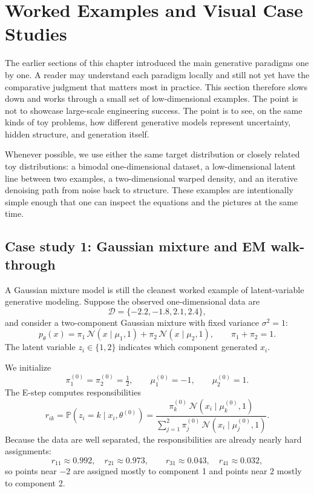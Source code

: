 
\section{Worked Examples and Visual Case Studies}

The earlier sections of this chapter introduced the main generative paradigms one by one.
A reader may understand each paradigm locally and still not yet have the comparative judgment that matters most in practice.
This section therefore slows down and works through a small set of low-dimensional examples.
The point is not to showcase large-scale engineering success.
The point is to see, on the same kinds of toy problems, how different generative models represent uncertainty, hidden structure, and generation itself.

\medskip

Whenever possible, we use either the same target distribution or closely related toy distributions:
a bimodal one-dimensional dataset, a low-dimensional latent line between two examples, a two-dimensional warped density, and an iterative denoising path from noise back to structure.
These examples are intentionally simple enough that one can inspect the equations and the pictures at the same time.

\subsection*{Case study 1: Gaussian mixture and EM walk-through}

A Gaussian mixture model is still the cleanest worked example of latent-variable generative modeling.
Suppose the observed one-dimensional data are
\[
\mathcal{D}=\{-2.2,-1.8,2.1,2.4\},
\]
and consider a two-component Gaussian mixture with fixed variance $\sigma^2=1$:
\[
p_\theta(x)=\pi_1\,\mathcal{N}(x\mid \mu_1,1)+\pi_2\,\mathcal{N}(x\mid \mu_2,1),
\qquad \pi_1+\pi_2=1.
\]
The latent variable $z_i\in\{1,2\}$ indicates which component generated $x_i$.

We initialize
\[
\pi_1^{(0)}=\pi_2^{(0)}=\tfrac12,
\qquad
\mu_1^{(0)}=-1,
\qquad
\mu_2^{(0)}=1.
\]
The E-step computes responsibilities
\[
r_{ik}
=
\mathbb{P}(z_i=k\mid x_i,\theta^{(0)})
=
\frac{\pi_k^{(0)}\,\mathcal{N}(x_i\mid \mu_k^{(0)},1)}{\sum_{j=1}^2 \pi_j^{(0)}\,\mathcal{N}(x_i\mid \mu_j^{(0)},1)}.
\]
Because the data are well separated, the responsibilities are already nearly hard assignments:
\[
r_{11}\approx 0.992,\quad r_{21}\approx 0.973,
\qquad
r_{31}\approx 0.043,\quad r_{41}\approx 0.032,
\]
so points near $-2$ are assigned mostly to component 1 and points near $2$ mostly to component 2.

